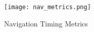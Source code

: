 











\begin{figure}[h!]
\begin{center}
\texttt{[image: nav\_metrics.png]}
\caption{Navigation Timing Metrics}
\label{img:latency}
\end{center}
\end{figure}







